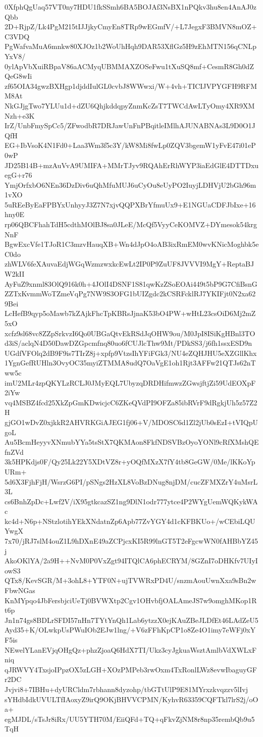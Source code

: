 0XfphQgUaq57VT0ny7HDU1fkSSmh6BA5BOJAf3NsBX1nPQkv3hu8en4AnAJ0zQbb
2D+RjpZ/Lk4PgM215tIJJjkyCmyEn8TRp9wEGmfV/+L7JegxF3BMVN8mOZ+C3VDQ
PgWafvaMuA6mnkw80XJOz1b2WoUhHqh9DAR53XflGz5H9zEhMTN156qCNLpYxV8/
0ylApVbXuiRBpaV86aACMyqUBMMAXZOSeFwu1tXuSQ8mf+CesmR8Gh0dZQeG8wIi
zf65OIA34gwzBXHgp1djddIulGL0cvbJ8WWwxi/W+4vh+TICIJVPYGFH9RFMM8At
NkGJjgTwo7YLUu1d+dZU6QhjkddqpyZnmKcZsT7TWCdAwLTyOmy4XR9XMNzh+e3K
IrZ/UnbFmySpCc5/ZFwodbR7DRJawUnFnPBqitleIMlhAJUNABNAs3L9D0O1JQfH
EG+IbVsoK4N1Fd0+Laa3Wm3f5c3Y/kW8Mi8fwLp0ZQV3bgemW1yFvE47i01eP0wP
JD25B14B+mzAuVvA9UMIFA+MMrTJyv9RQAhErRhWYP3iaEdGlE4DTTDxuegG+r76
YmjOrfxbO6NEn36DzDiv6uQhMfuMUJ6uCyOu8eUyPO2IuyjLDHVjU2bGh96m1vXO
5uREeByEaFPBYxUnhyyJ3Z7N7xjvQQPXBrYfmuUx9+E1NGUaCDFJbIxe+16hny0E
rp06QBCFhahTdH5cdthMOlBJ8sa0JLeE/McQf5VyyCeKOMVZ+DYmesok54krgNnF
BgwExcVfe1TJoR1C3mzvHauqXB+Wn4dJpO4oAB3ixRmEM0wvKNicMoghbk5eC0do
zhWLV6feXAuvaEdjWGqWzmzwxkcEwLt2IP0P9ZuUF8JVVVI9MgY+ReptaBJW2kII
AyFuZ9xnml83OlQ916k0h+4JOlI4DSNF1S81qwKzZSoEOAi449t5bP9G7CfiBsnG
ZZTxKvmmWoTZmeVqPg7NW9S3OFG1bUIZgdc2kCSRFcklRJ7YKIFjt0N2xa629Bei
LcHefB9qyp5oMawb7kZAjkFhcTpKBRsJjnaK53bO4PW+wHtL23csOiD6Mj2mZ5xO
xcfz9sl68vc8ZZpSrkvzI6Qo0UBGaQtvEkRSdJqOHW9ou/M0JpI8ISiKgHBnl3TO
d3iS/aclqN4D50DawDZGpcmfnq80uo6fCUJlcThw9Mt/PDkSS3/j6fh1ssxESD9n
UGdfVFOlq2dB9F9is7TIrZ8j+xpfp9VtzsIhYFiFGk3/NU4eZQHJHU5eXZGllKhx
1YgnGefRUHln3OvyOC35myiZTMMA8udQ7OaVgE1oh1Rjt3AFFw21QTJs62nTww5c
imU2MLr4zpQKYLzRCLJ0JMyEQL7UbyzqDRDHifmwzZGwsjftjZi59UdEOXpF2iYw
vq4MSBZ4fcd25XkZpGmKDwicjcC6ZKeQVdPI9OFZa85ibRVrF9dRgkjUh5z57Z2H
gjGO1wDvZ0xjkkR2AHVRKGiAJEG1fj06+V/MDOSC6d1Zl2jUb0sEzI+tVIQpUgoL
Au5BcmHeyyvXNmubYYa5tsStX7QKMAon8FkfNDSVBzOyoYONl9cRfXMshQEfnZVd
3k5HPKdjs0F/Qy25Lk22Y5XDtVZ8r+yOQfMXzX7fY4tb8GeGW/0Me/lKKoYpURm+
5d6X3FjhFjH/WsrzG6PI/pSNgs2HzXL8VoBzDNug8njDM/cucZFMXZrY4uMsrL3L
cs6BnhZpDc+Lwf2V/iX95gtkcazSZ1ng9DlN1odr777ytce4P2WYgUemWQKykWAc
kc4d+N6p+NStzlotihYEkXNdatnZp6Apb77ZvYGY4d1cKFBKUo+/wCEbiLQUYwgX
7x70/jRJ7slM4ouZ1L9hDXnE49aZCPjcxKI5R99lnGT5T2eFgcwWN0fAHBbYZ45j
AkoOKlYA/2a9H++NvM0P0VxZgt94ITQlCA6phECRYM/8GZnI7oDHKfv7UIyIowS3
QTx8/KevSGR/M+3ohL8+YTF0N+ujTVWRxPD4U/snzmAouUwnXxa9sBn2wFbwNGas
KnMYpqo4JbFersbjciUeTj0BVWXtp2Cgv1OHvbfjOALAmeJS7w9omghMKop1Rt6p
Jn1n74gs8BDLrSFDI57nHn7TYtYnQh1Lab6ytzzX0ejKAuZBeJLDfEt46LAdZeU5
Ayd35+K/OLwkpUsPWuIOb2EJw1lng/+V6zFFhKpCP1o8Ze4O1imy7eWFj0xYF5is
NEwelYLanEVjqOHgQz+phzZjoaQ6HdX7TI/Ukz3cyJgkuaWsztAmlbVdXWLxFniq
qJRWVY4TxsjoIPpzOX5zLGH+XOzPMPeb3rwOxm4TxRonlLWz8evwIbaguyGFr2DC
Jvjvi8+7IBHu+dyURCldm7rbhann8dyzohp/tbGTtUlP9E81MYrxzkvqzzv5lIvj
sYHdbIdkUVULTfIAoxyZ9irQ9OKjBHVVCPMN/KyhvR63359CQFTkl7lrS2j/oOa+
egMJDL/sTsJr8iRx/UU5YTH70M/EiiQFd+TQ+qFkvZjNM8r8np35rembQb9u5TqH
